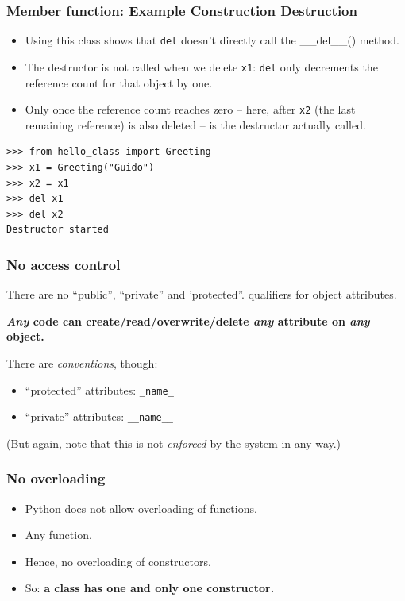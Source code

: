 \begin{frame}[fragile]\frametitle{Member function: Example Construction Destruction}

   \begin{itemize}
  \item Using this class shows that \texttt{del} doesn't directly call the \_\_del\_\_() method.
  \item The destructor is not called when we delete \texttt{x1}: \texttt{del} only decrements the reference count for that object by one.
  \item Only once the reference count reaches zero -- here, after \texttt{x2} (the last remaining reference) is also deleted -- is the destructor actually called.
     \end{itemize}
\begin{lstlisting}
>>> from hello_class import Greeting
>>> x1 = Greeting("Guido")
>>> x2 = x1
>>> del x1
>>> del x2
Destructor started
\end{lstlisting}
\end{frame}



\begin{frame}
  \frametitle{No access control}
  There are no ``public'', ``private'' and 'protected''. qualifiers for object
  attributes.

  
  \textbf{\emph{Any} code can create/read/overwrite/delete \emph{any} attribute on
    \emph{any} object.}

  
  There are \emph{conventions}, though:
  \begin{itemize}
  \item ``protected'' attributes: \texttt{\_name\_}
  \item ``private'' attributes: \texttt{\_\_name\_\_}
  \end{itemize}
  (But again, note that this is not \emph{enforced} by the system in
  any way.)

\end{frame}

 \begin{frame}\frametitle{No overloading}

\begin{itemize}
\item Python does not allow overloading of functions.
\item Any function.
\item Hence, no overloading of constructors.
\item So: \textbf{a class has one and only one constructor.}
\end{itemize}
 \end{frame}


